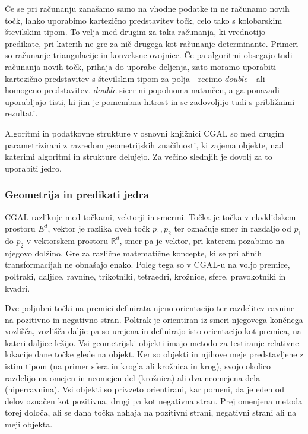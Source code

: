 \documentclass[a4paper, 12pt]{book}
\newcommand{\RR}{\ensuremath{\mathbb R}}  %
\begin{document}
\bigbreak
Če se pri računanju zanašamo samo na vhodne podatke in ne računamo novih točk, lahko uporabimo kartezično predstavitev točk, celo tako s kolobarskim številskim tipom. To velja med drugim za taka računanja, ki vrednotijo predikate, pri katerih ne gre za nič drugega kot računanje determinante. Primeri so računanje triangulacije in konveksne ovojnice. Če pa algoritmi obsegajo tudi računanja novih točk, prihaja do uporabe deljenja, zato moramo uporabiti kartezično predstavitev s številskim tipom za polja - recimo $double$ - ali homogeno predstavitev. $double$ sicer ni popolnoma natančen, a ga ponavadi uporabljajo tisti, ki jim je pomembna hitrost in se zadovoljijo tudi s približnimi rezultati.

Algoritmi in podatkovne strukture v osnovni knjižnici CGAL so med drugim parametrizirani z razredom geometrijskih značilnosti, ki zajema objekte, nad katerimi algoritmi in strukture
delujejo. Za večino slednjih je dovolj za to uporabiti jedro.

\subsubsection{Geometrija in predikati jedra}
CGAL razlikuje med točkami, vektorji in smermi. Točka je točka v ekvklidskem prostoru $E^d$, vektor je razlika dveh točk $p_1, p_2$ ter označuje smer in razdaljo od $p_1$ do $p_2$ v vektorskem prostoru $\RR^d$, smer pa je vektor, pri katerem pozabimo na njegovo dolžino. Gre za različne matematične koncepte, ki se pri afinih transformacijah ne obnašajo enako.
Poleg tega so v CGAL-u na voljo premice, poltraki, daljice, ravnine, trikotniki, tetraedri,  krožnice, sfere, pravokotniki in kvadri.

Dve poljubni točki na premici definirata njeno orientacijo ter razdelitev ravnine na pozitivno in negativno stran. Poltrak je orientiran iz smeri njegovega končnega vozlišča, vozlišča daljic pa so urejena in definirajo isto orientacijo kot premica, na kateri daljice ležijo. Vsi geometrijski objekti imajo metodo za testiranje relativne lokacije dane točke glede na objekt. Ker so objekti in njihove meje predstavljene z istim tipom (na primer sfera in krogla ali krožnica in krog), svojo okolico razdelijo na omejen in neomejen del (krožnica) ali dva neomejena dela (hiperravnina). Vsi objekti so privzeto orientirani, kar pomeni, da je eden od delov označen kot pozitivna, drugi pa kot negativna stran. Prej omenjena metoda torej določa, ali se dana točka nahaja na pozitivni strani, negativni strani ali na meji objekta. 
\end{document}
